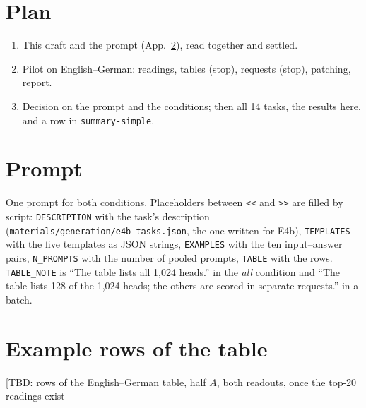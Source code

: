 \documentclass[11pt,a4paper]{article}
\newcommand{\tbd}[1]{\textcolor{red!70!black}{\textsf{[TBD: #1]}}}
\begin{document}
\section{Plan}\label{sec:plan}
\begin{enumerate}
  \item This draft and the prompt (App.~\ref{app:prompts}), read together and settled.
  \item Pilot on English--German: readings, tables (stop), requests (stop), patching, report.
  \item Decision on the prompt and the conditions; then all 14 tasks, the results here, and a row in \texttt{summary-simple}.
\end{enumerate}

\appendix
\section{Prompt}\label{app:prompts}

One prompt for both conditions. Placeholders between \texttt{<<} and \texttt{>>} are filled by script: \texttt{DESCRIPTION} with the task's description (\texttt{materials/generation/e4b\_tasks.json}, the one written for E4b), \texttt{TEMPLATES} with the five templates as JSON strings, \texttt{EXAMPLES} with the ten input--answer pairs, \texttt{N\_PROMPTS} with the number of pooled prompts, \texttt{TABLE} with the rows. \texttt{TABLE\_NOTE} is ``The table lists all 1,024 heads.'' in the \emph{all} condition and ``The table lists 128 of the 1,024 heads; the others are scored in separate requests.'' in a batch.


\section{Example rows of the table}\label{app:rows}
\tbd{rows of the English--German table, half $A$, both readouts, once the top-20 readings exist}
\end{document}
